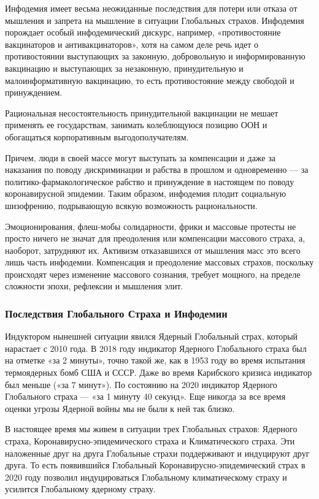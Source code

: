 Инфодемия имеет весьма неожиданные последствия для потери или отказа от
мышления и запрета на мышление в ситуации Глобальных страхов. Инфодемия
порождает особый инфодемический дискурс, например, «противостояние вакцинаторов
и антивакцинаторов», хотя на самом деле речь идет о противостоянии выступающих
за законную, добровольную и информированную вакцинацию и выступающих за
незаконную, принудительную и малоинформативную вакцинацию, то есть
противостояние между свободой и принуждением.

Рациональная несостоятельность принудительной вакцинации не мешает применять ее
государствам, занимать колеблющуюся позицию ООН и обогащаться корпоративным
выгодополучателям.

Причем, люди в своей массе могут выступать за компенсации и даже за наказания
по поводу дискриминации и рабства в прошлом и одновременно — за
политико-фармакологическое рабство и принуждение в настоящем по поводу
коронавирусной эпидемии. Таким образом, инфодемия плодит социальную шизофрению,
подрывающую всякую возможность рациональности.

Эмоционирования, флеш-мобы солидарности, фрики и массовые протесты не просто
ничего не значат для преодоления или компенсации массового страха, а, наоборот,
затрудняют их. Активизм отказавшихся от мышления масс это всего лишь часть
инфодемии. Компенсация и преодоление массовых страхов, поскольку происходят
через изменение массового сознания, требует мощного, на пределе сложности
эпохи, рефлексии и мышления элит.

\subsubsection{Последствия Глобального Страха и Инфодемии}

Индуктором нынешней ситуации явился Ядерный Глобальный страх, который нарастает
с 2010 года. В 2018 году индикатор Ядерного Глобального страха был на отметке
«за 2 минуты», точно такой же, как в 1953 году во время испытания термоядерных
бомб США и СССР. Даже во время Карибского кризиса индикатор был меньше («за 7
минут»). По состоянию на 2020 индикатор Ядерного Глобального страха — «за 1
минуту 40 секунд». Еще никогда за все время оценки угрозы Ядерной войны мы не
были к ней так близко.

В настоящее время мы живем в ситуации трех Глобальных страхов: Ядерного страха,
Коронавирусно-эпидемического страха и Климатического страха. Эти наложенные
друг на друга Глобальные страхи поддерживают и индуцируют друг друга. То есть
появившийся Глобальный Коронавирусно-эпидемический страх в 2020 году позволил
индуцироваться Глобальному климатическому страху и усилится Глобальному
ядерному страху.

